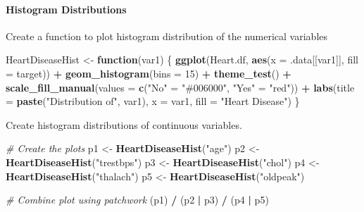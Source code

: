 \documentclass[
]{article}
\newenvironment{Shaded}{\begin{snugshade}}{\end{snugshade}}
\newcommand{\AttributeTok}[1]{\textcolor[rgb]{0.13,0.29,0.53}{#1}}
\newcommand{\CommentTok}[1]{\textcolor[rgb]{0.56,0.35,0.01}{\textit{#1}}}
\newcommand{\ControlFlowTok}[1]{\textcolor[rgb]{0.13,0.29,0.53}{\textbf{#1}}}
\newcommand{\DecValTok}[1]{\textcolor[rgb]{0.00,0.00,0.81}{#1}}
\newcommand{\FunctionTok}[1]{\textcolor[rgb]{0.13,0.29,0.53}{\textbf{#1}}}
\newcommand{\NormalTok}[1]{#1}
\newcommand{\OtherTok}[1]{\textcolor[rgb]{0.56,0.35,0.01}{#1}}
\newcommand{\SpecialCharTok}[1]{\textcolor[rgb]{0.81,0.36,0.00}{\textbf{#1}}}
\newcommand{\StringTok}[1]{\textcolor[rgb]{0.31,0.60,0.02}{#1}}
\begin{document}
\paragraph{\texorpdfstring{\textbf{Histogram
Distributions}}{Histogram Distributions}}\label{histogram-distributions}

Create a function to plot histogram distribution of the numerical
variables

\begin{Shaded}
\begin{Highlighting}[]
\NormalTok{HeartDiseaseHist }\OtherTok{\textless{}{-}} \ControlFlowTok{function}\NormalTok{(var1) \{}
  \FunctionTok{ggplot}\NormalTok{(Heart.df, }\FunctionTok{aes}\NormalTok{(}\AttributeTok{x =}\NormalTok{ .data[[var1]], }\AttributeTok{fill =}\NormalTok{ target)) }\SpecialCharTok{+}
    \FunctionTok{geom\_histogram}\NormalTok{(}\AttributeTok{bins =} \DecValTok{15}\NormalTok{) }\SpecialCharTok{+} \FunctionTok{theme\_test}\NormalTok{() }\SpecialCharTok{+}
    \FunctionTok{scale\_fill\_manual}\NormalTok{(}\AttributeTok{values =} \FunctionTok{c}\NormalTok{(}\StringTok{"No"} \OtherTok{=} \StringTok{"\#006000"}\NormalTok{, }\StringTok{"Yes"} \OtherTok{=} \StringTok{"red"}\NormalTok{)) }\SpecialCharTok{+}
    \FunctionTok{labs}\NormalTok{(}\AttributeTok{title =} \FunctionTok{paste}\NormalTok{(}\StringTok{"Distribution of"}\NormalTok{, var1),}
         \AttributeTok{x =}\NormalTok{ var1, }\AttributeTok{fill =} \StringTok{"Heart Disease"}\NormalTok{)}
\NormalTok{\}}
\end{Highlighting}
\end{Shaded}

Create histogram distributions of continuous variables.

\begin{Shaded}
\begin{Highlighting}[]
\CommentTok{\# Create the plots}
\NormalTok{p1 }\OtherTok{\textless{}{-}} \FunctionTok{HeartDiseaseHist}\NormalTok{(}\StringTok{"age"}\NormalTok{)}
\NormalTok{p2 }\OtherTok{\textless{}{-}} \FunctionTok{HeartDiseaseHist}\NormalTok{(}\StringTok{"trestbps"}\NormalTok{)}
\NormalTok{p3 }\OtherTok{\textless{}{-}} \FunctionTok{HeartDiseaseHist}\NormalTok{(}\StringTok{"chol"}\NormalTok{)}
\NormalTok{p4 }\OtherTok{\textless{}{-}} \FunctionTok{HeartDiseaseHist}\NormalTok{(}\StringTok{"thalach"}\NormalTok{)}
\NormalTok{p5 }\OtherTok{\textless{}{-}} \FunctionTok{HeartDiseaseHist}\NormalTok{(}\StringTok{"oldpeak"}\NormalTok{)}

\CommentTok{\# Combine plot using patchwork}
\NormalTok{(p1) }\SpecialCharTok{/}
\NormalTok{(p2 }\SpecialCharTok{|}\NormalTok{ p3) }\SpecialCharTok{/}
\NormalTok{(p4 }\SpecialCharTok{|}\NormalTok{ p5)}
\end{Highlighting}
\end{Shaded}
\end{document}

